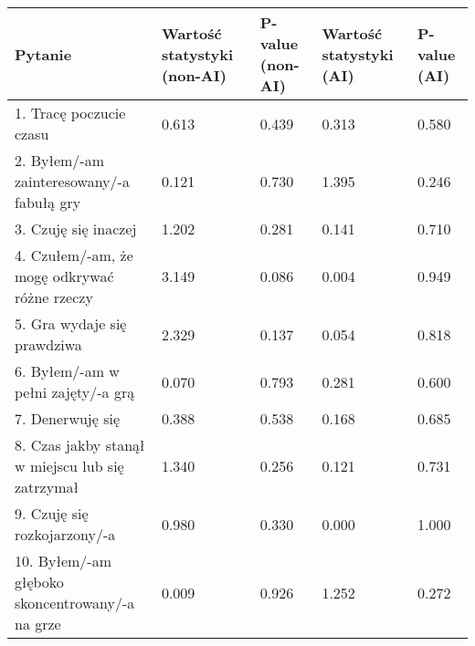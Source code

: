 \begin{table}[h!]
    \begin{center}
        \begin{tabular}{|m{10em}|m{5em}|m{5em}|m{5em}|m{5em}|}
            \hline
            Pytanie                                                           & Wartość statystyki (non-AI) & P-value (non-AI) & Wartość statystyki (AI) & P-value (AI) \\
            \hline
            1. Tracę poczucie czasu                                           & 0.613                       & 0.439            & 0.313                   & 0.580        \\
            2. Byłem/-am \newline zainteresowany/-a fabułą gry                & 0.121                       & 0.730            & 1.395                   & 0.246        \\
            3. Czuję się inaczej                                              & 1.202                       & 0.281            & 0.141                   & 0.710        \\
            4. Czułem/-am, że mogę odkrywać różne rzeczy                      & 3.149                       & 0.086            & 0.004                   & 0.949        \\
            5. Gra wydaje się prawdziwa                                       & 2.329                       & 0.137            & 0.054                   & 0.818        \\
            6. Byłem/-am \newline w pełni zajęty/-a grą                       & 0.070                       & 0.793            & 0.281                   & 0.600        \\
            7. Denerwuję się                                                  & 0.388                       & 0.538            & 0.168                   & 0.685        \\
            8. Czas jakby stanął w miejscu lub się zatrzymał                  & 1.340                       & 0.256            & 0.121                   & 0.731        \\
            9. Czuję się \newline rozkojarzony/-a                             & 0.980                       & 0.330            & 0.000                   & 1.000        \\
            10. Byłem/-am głęboko \newline skoncentrowany/-a \newline na grze & 0.009                       & 0.926            & 1.252                   & 0.272        \\

\end{tabular}
\end{center}
\end{table}
